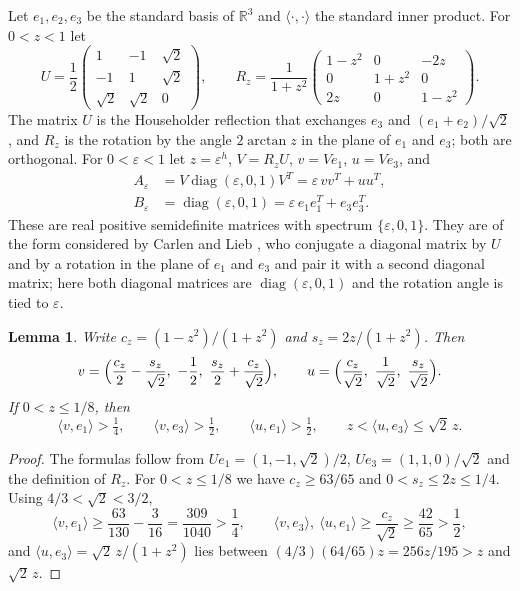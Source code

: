 \documentclass{amsart}
\newtheorem{lemma}[theorem]{Lemma}
\theoremstyle{definition}
\theoremstyle{remark}
\numberwithin{equation}{section}
\begin{document}
Let $e_1,e_2,e_3$ be the standard basis of $\mathbb{R}^3$ and $\langle\cdot,\cdot\rangle$ the standard inner product. For $0<z<1$ let
\[
U=\frac12\begin{pmatrix}1&-1&\sqrt2\\-1&1&\sqrt2\\\sqrt2&\sqrt2&0\end{pmatrix},\qquad
R_z=\frac{1}{1+z^2}\begin{pmatrix}1-z^2&0&-2z\\0&1+z^2&0\\2z&0&1-z^2\end{pmatrix}.
\]
The matrix $U$ is the Householder reflection that exchanges $e_3$ and $(e_1+e_2)/\sqrt2$, and $R_z$ is the rotation by the angle $2\arctan z$ in the plane of $e_1$ and $e_3$; both are orthogonal. For $0<\varepsilon<1$ let $z=\varepsilon^h$, $V=R_zU$, $v=Ve_1$, $u=Ve_3$, and
\begin{equation}\label{eq:family}
\begin{aligned}
A_\varepsilon&=V\operatorname{diag}(\varepsilon,0,1)V^{T}=\varepsilon\,vv^{T}+uu^{T},\\
B_\varepsilon&=\operatorname{diag}(\varepsilon,0,1)=\varepsilon\,e_1e_1^{T}+e_3e_3^{T}.
\end{aligned}
\end{equation}
These are real positive semidefinite matrices with spectrum $\{\varepsilon,0,1\}$. They are of the form considered by Carlen and Lieb \cite[Section~IV]{CL}, who conjugate a diagonal matrix by $U$ and by a rotation in the plane of $e_1$ and $e_3$ and pair it with a second diagonal matrix; here both diagonal matrices are $\operatorname{diag}(\varepsilon,0,1)$ and the rotation angle is tied to $\varepsilon$.

\begin{lemma}\label{lem:overlaps}
Write $c_z=(1-z^2)/(1+z^2)$ and $s_z=2z/(1+z^2)$. Then
\[
v=\Bigl(\frac{c_z}{2}-\frac{s_z}{\sqrt2},\ -\frac12,\ \frac{s_z}{2}+\frac{c_z}{\sqrt2}\Bigr),\qquad
u=\Bigl(\frac{c_z}{\sqrt2},\ \frac{1}{\sqrt2},\ \frac{s_z}{\sqrt2}\Bigr).
\]
If $0<z\le 1/8$, then
\[
\langle v,e_1\rangle>\tfrac14,\qquad \langle v,e_3\rangle>\tfrac12,\qquad\langle u,e_1\rangle>\tfrac12,\qquad z<\langle u,e_3\rangle\le\sqrt2\,z .
\]
\end{lemma}

\begin{proof}
The formulas follow from $Ue_1=(1,-1,\sqrt2)/2$, $Ue_3=(1,1,0)/\sqrt2$ and the definition of $R_z$. For $0<z\le 1/8$ we have $c_z\ge 63/65$ and $0<s_z\le 2z\le 1/4$. Using $4/3<\sqrt2<3/2$,
\[
\langle v,e_1\rangle\ge\frac{63}{130}-\frac{3}{16}=\frac{309}{1040}>\frac14,\qquad
\langle v,e_3\rangle,\ \langle u,e_1\rangle\ge\frac{c_z}{\sqrt2}\ge\frac{42}{65}>\frac12,
\]
and $\langle u,e_3\rangle=\sqrt2\,z/(1+z^2)$ lies between $(4/3)(64/65)z=256z/195>z$ and $\sqrt2\,z$.
\end{proof}
\end{document}

